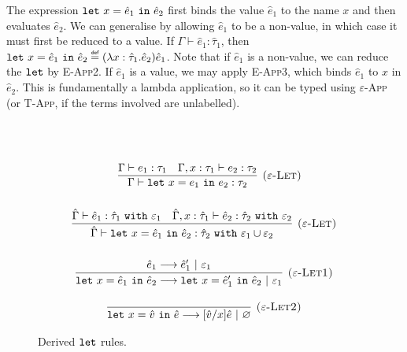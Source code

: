 \noindent
The expression $\mathtt{let}~ x = \hat e_1~\mathtt{in}~ \hat e_2$ first binds the value $\hat e_1$ to the name $x$ and then evaluates $\hat e_2$. We can generalise by allowing $\hat e_1$ to be a non-value, in which case it must first be reduced to a value. If $\Gamma \vdash \hat e_1: \hat \tau_1$, then $\letxpr{x}{\hat e_1}{\hat e_2} \defn (\lambda x: \hat \tau_1 . \hat e_2) \hat e_1$. Note that if $\hat e_1$ is a non-value, we can reduce the $\mathtt{let}$ by \textsc{E-App2}. If $\hat e_1$ is a value, we may apply \textsc{E-App3}, which binds $\hat e_1$ to $x$ in $\hat e_2$. This is fundamentally a lambda application, so it can be typed using \textsc{$\varepsilon$-App} (or \textsc{T-App}, if the terms involved are unlabelled).

\begin{figure}[h]

 \\
 \\

\[
\begin{array}{c}

	~~~
	
	\infer[\textsc{($\varepsilon$-Let)}]
	{\Gamma \vdash \letxpr{x}{e_1}{e_2}: \tau_2}
	{\Gamma \vdash e_1: \tau_1 & \Gamma, x: \tau_1 \vdash e_2: \tau_2} \\[4ex]

\infer[\textsc{($\varepsilon$-Let)}]
	{\hat \Gamma \vdash \letxpr{x}{\hat e_1}{\hat e_2} : \hat \tau_2~\kw{with} \varepsilon_1 \cup \varepsilon_2}
	{\hat \Gamma \vdash \hat e_1 : \hat \tau_1~\kw{with} \varepsilon_1 & \hat \Gamma, x: \hat \tau_1 \vdash \hat e_2: \hat \tau_2~\kw{with} \varepsilon_2} \\[4ex]

\infer[\textsc{($\varepsilon$-Let1)}]
	{\letxpr{x}{\hat e_1}{\hat e_2} \longrightarrow \letxpr{x}{\hat e_1'}{\hat e_2}~|~\varepsilon_1}
	{\hat e_1 \longrightarrow \hat e_1'~|~\varepsilon_1} \\[3ex]
	
\infer[\textsc{($\varepsilon$-Let2)}]
	{\letxpr{x}{\hat v}{\hat e} \longrightarrow [\hat v/x]\hat e~|~\varnothing}
	{} 

\end{array}
\]


\caption{Derived $\mathtt{let}$ rules.}
\label{This is the label.}
\end{figure}

